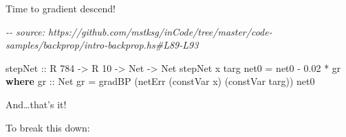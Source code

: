 \documentclass[]{article}
\newenvironment{Shaded}{}{}
\newcommand{\CommentTok}[1]{\textcolor[rgb]{0.38,0.63,0.69}{\textit{#1}}}
\newcommand{\DataTypeTok}[1]{\textcolor[rgb]{0.56,0.13,0.00}{#1}}
\newcommand{\DecValTok}[1]{\textcolor[rgb]{0.25,0.63,0.44}{#1}}
\newcommand{\FloatTok}[1]{\textcolor[rgb]{0.25,0.63,0.44}{#1}}
\newcommand{\KeywordTok}[1]{\textcolor[rgb]{0.00,0.44,0.13}{\textbf{#1}}}
\newcommand{\NormalTok}[1]{#1}
\newcommand{\OperatorTok}[1]{\textcolor[rgb]{0.40,0.40,0.40}{#1}}
\newcommand{\OtherTok}[1]{\textcolor[rgb]{0.00,0.44,0.13}{#1}}
\begin{document}
Time to gradient descend!

\begin{Shaded}
\begin{Highlighting}[]
\CommentTok{{-}{-} source: https://github.com/mstksg/inCode/tree/master/code{-}samples/backprop/intro{-}backprop.hs\#L89{-}L93}

\OtherTok{stepNet ::} \DataTypeTok{R} \DecValTok{784} \OtherTok{{-}\textgreater{}} \DataTypeTok{R} \DecValTok{10} \OtherTok{{-}\textgreater{}} \DataTypeTok{Net} \OtherTok{{-}\textgreater{}} \DataTypeTok{Net}
\NormalTok{stepNet x targ net0 }\OtherTok{=}\NormalTok{ net0 }\OperatorTok{{-}} \FloatTok{0.02} \OperatorTok{*}\NormalTok{ gr}
  \KeywordTok{where}
\OtherTok{    gr ::} \DataTypeTok{Net}
\NormalTok{    gr }\OtherTok{=}\NormalTok{ gradBP (netErr (constVar x) (constVar targ)) net0}
\end{Highlighting}
\end{Shaded}

And\ldots that's it!

To break this down:
\end{document}
